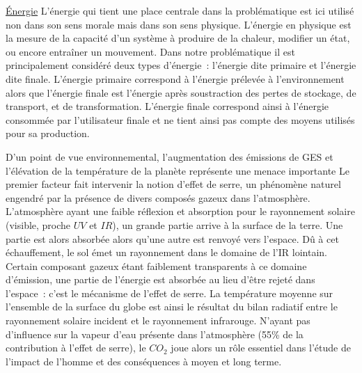 \href{https://fr.wikipedia.org/wiki/%C3%89nergie_(physique)}{Énergie}
L’énergie qui tient une place centrale dans la problématique est ici utilisé non dans
son sens morale mais dans son sens physique. L’énergie en physique est la mesure
de la capacité d’un système à produire de la chaleur, modifier un état, ou encore
entraîner un mouvement. Dans notre problématique il est principalement considéré
deux types d’énergie~: l’énergie dite primaire et l’énergie dite finale.
L’énergie primaire correspond à l’énergie prélevée à l’environnement alors que l’énergie
finale est l’énergie après soustraction des pertes de stockage, de transport, et de
transformation. L’énergie finale correspond ainsi à l’énergie consommée par l’utilisateur
finale et ne tient ainsi pas compte des moyens utilisés pour sa production.


D’un point de vue environnemental, l’augmentation des émissions de GES et l’élévation
de la température de la planète représente une menace importante
Le premier facteur fait intervenir la notion d’effet de serre, un phénomène naturel
engendré par la présence de divers composés gazeux dans l’atmosphère.
L’atmosphère ayant une faible réflexion et absorption pour le rayonnement solaire
(visible, proche $UV$ et $IR$), un grande partie arrive à la surface de la terre. Une
partie est alors absorbée alors qu’une autre est renvoyé vers l’espace. Dû à cet
échauffement, le sol émet un rayonnement dans le domaine de l’IR lointain. Certain
composant gazeux étant faiblement transparents à ce domaine d’émission, une partie
de l’énergie est absorbée au lieu d’être rejeté dans l’espace~: c’est le mécanisme
de l’effet de serre.
La température moyenne sur l’ensemble de la surface du globe est ainsi le résultat
du bilan radiatif entre le rayonnement solaire incident et le rayonnement infrarouge.
N’ayant pas d’influence sur la vapeur d’eau présente dans l’atmosphère
(55\% de la contribution à l’effet de serre), le $CO_{2}$ joue alors un rôle essentiel
dans l’étude de l’impact de l’homme et des conséquences à moyen et long terme.





